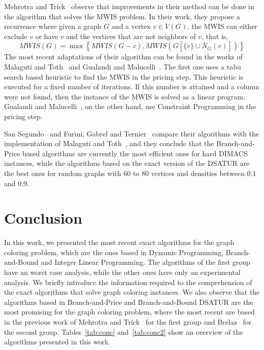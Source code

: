 \documentclass[fleqn,10pt]{SelfArx} %
\newcommand{\chaves}[1] {\ensuremath{{\left \{ {#1} \right \}}}}
\newcommand{\Max}[1] {\ensuremath{\max\chaves{#1}}}
\begin{document}
	Mehrotra and Trick~\cite{Mehrotra95} observe that improvements in their method can
	be done in the algorithm that solves the MWIS problem. In their work,
	they propose a recurrence where given a graph $G$ and a vertex $v \in
	V(G)$, the MWIS can either exclude $v$ or have $v$ and the vertices
	that are not neighbors of $v$, that is, 
	\begin{equation*}
	MWIS(G) =
	\Max{MWIS(G-v),MWIS(G[\{v\} \cup \overline{N}_G(v)])}
	\end{equation*}
	The most recent adaptations of their algorithm can be found in the works of Malaguti and Toth~\cite{Malaguti2010} and Gualandi and Malucelli~\cite{Gualandi2010}. The first one
	uses a tabu search based heuristic to find the MWIS in the pricing
	step. This heuristic is executed for a fixed number of iterations. If
	this number is attained and a column were not found, then the instance
	of the MWIS is solved as a linear program. Gualandi and Malucelli~\cite{Gualandi2010},
	on the other hand, use Constraint Programming in the pricing step.
	
	San Segundo~\cite{SanSegundo2012} and Furini, Gabrel and Ternier~\cite{Furini2017} compare their
	algorithms with the implementation of Malaguti and Toth~\cite{Malaguti2010}, and
	they conclude that the Branch-and-Price based algorithms are currently
	the most efficient ones for hard DIMACS instances, while the
	algorithms based on the exact version of the \textsf{DSATUR} are the best ones
	for random graphs with 60 to 80 vertices and densities between 0.1 and
	0.9.
	
	\section{Conclusion}\label{sec:conclusion}
	

	
	
	In this work, we presented the most recent exact algorithms for the
	graph coloring problem, which are the ones based in Dynamic
	Programming, Branch-and-Bound and Integer Linear Programming. The
	algorithms of the first group have an worst case analysis, while the
	other ones have only an experimental analysis. We briefly
	introduce the information required to the comprehension of the exact
	algorithms that solve graph coloring instances. We also observe that
	the algorithms based in Branch-and-Price and Branch-and-Bound \textsf{DSATUR}
	are the most promising for the graph coloring problem, where the most
	recent are based in the previous work of Mehrotra and Trick~\cite{Mehrotra95} for
	the first group and Brelaz~\cite{Brelaz79} for the second group. Tables~\ref{tab:conc} and~\ref{tab:conc2} show an overview of the algorithms presented in this work.
	
\end{document}
